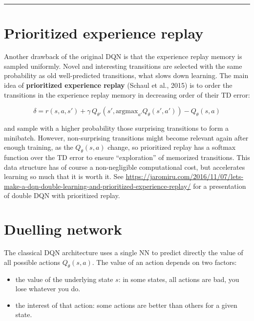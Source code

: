 \documentclass[
  letterpaper,
  DIV=11,
  numbers=noendperiod]{scrreprt}
\providecommand{\tightlist}{%
  \setlength{\itemsep}{0pt}\setlength{\parskip}{0pt}}\usepackage{longtable,booktabs,array}
\begin{document}
\begin{center}\rule{0.5\linewidth}{0.5pt}\end{center}

\hypertarget{prioritized-experience-replay}{%
\section{Prioritized experience
replay}\label{prioritized-experience-replay}}

Another drawback of the original DQN is that the experience replay
memory is sampled uniformly. Novel and interesting transitions are
selected with the same probability as old well-predicted transitions,
what slows down learning. The main idea of \textbf{prioritized
experience replay} (Schaul et al., 2015) is to order the transitions in
the experience replay memory in decreasing order of their TD error:

\[
    \delta = r(s, a, s') + \gamma \, Q_{\theta'}(s', \text{argmax}_{a'} Q_\theta (s', a')) - Q_\theta(s, a)
\]

and sample with a higher probability those surprising transitions to
form a minibatch. However, non-surprising transitions might become
relevant again after enough training, as the \(Q_\theta(s, a)\) change,
so prioritized replay has a softmax function over the TD error to ensure
``exploration'' of memorized transitions. This data structure has of
course a non-negligible computational cost, but accelerates learning so
much that it is worth it. See
\url{https://jaromiru.com/2016/11/07/lets-make-a-dqn-double-learning-and-prioritized-experience-replay/}
for a presentation of double DQN with prioritized replay.

\hypertarget{duelling-network}{%
\section{Duelling network}\label{duelling-network}}

The classical DQN architecture uses a single NN to predict directly the
value of all possible actions \(Q_\theta(s, a)\). The value of an action
depends on two factors:

\begin{itemize}
\tightlist
\item
  the value of the underlying state \(s\): in some states, all actions
  are bad, you lose whatever you do.
\item
  the interest of that action: some actions are better than others for a
  given state.
\end{itemize}
\end{document}
